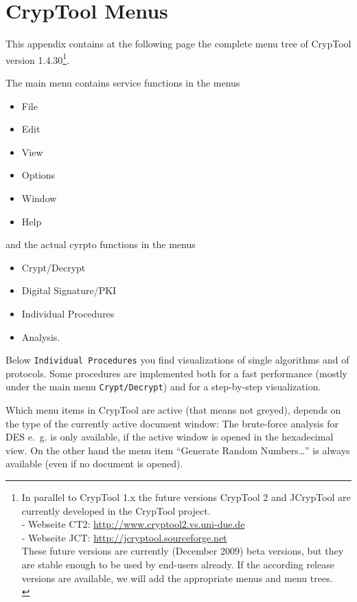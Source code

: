 
\newpage
\enlargethispage{1cm}
\hypertarget{appendix-menutree}{}
\section{CrypTool Menus}
\label{s:appendix-menutree}

This appendix contains at the following page the complete menu tree of
CrypTool version 1.4.30\footnote{%
  In parallel to CrypTool 1.x the future versions
  CrypTool 2 and JCrypTool
  are currently developed in the CrypTool project.\\
  - Webseite CT2: \url{http://www.cryptool2.vs.uni-due.de} \\
  - Webseite JCT: \url{http://jcryptool.sourceforge.net} \\
  These future versions are currently (December 2009) beta versions, but they
  are stable enough to be used by end-users already. If the according release
  versions are available, we will add the appropriate menus and menu trees.\\
}. 

\noindent The main menu contains service functions in the menus
\begin{itemize}
   \item File
   \item Edit
   \item View
   \item Options
   \item Window
   \item Help
\end{itemize}
and the actual cyrpto functions in the menus
\begin{itemize}
   \item Crypt/Decrypt
   \item Digital Signature/PKI
   \item Individual Procedures
   \item Analysis.
\end{itemize}

Below \verb#Individual Procedures# you find visualizations of single algorithms
and of protocols. Some procedures are implemented both for a fast performance
(mostly under the main menu \verb#Crypt/Decrypt#) and for a step-by-step visualization.

Which menu items in CrypTool are active (that means not greyed), depends on
the type of the currently active document window:
The brute-force analysis for DES e.~g. is only
available, if the active window is opened in the hexadecimal view. 
On the other hand the menu item ``Generate Random Numbers\dots''
is always available (even if no document is opened).

